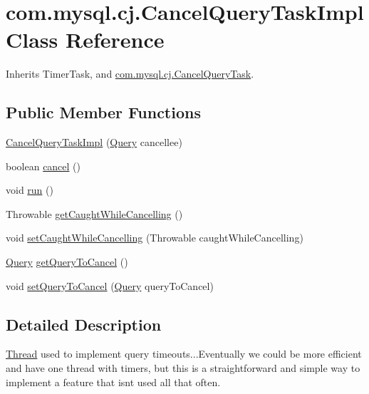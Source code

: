 \hypertarget{classcom_1_1mysql_1_1cj_1_1_cancel_query_task_impl}{}\section{com.\+mysql.\+cj.\+Cancel\+Query\+Task\+Impl Class Reference}
\label{classcom_1_1mysql_1_1cj_1_1_cancel_query_task_impl}


Inherits Timer\+Task, and \mbox{\hyperlink{interfacecom_1_1mysql_1_1cj_1_1_cancel_query_task}{com.\+mysql.\+cj.\+Cancel\+Query\+Task}}.

\subsection*{Public Member Functions}
\begin{DoxyCompactItemize}
\item 
\mbox{\hyperlink{classcom_1_1mysql_1_1cj_1_1_cancel_query_task_impl_a9a2ee8d146a3c365162fe26c214aa440}{Cancel\+Query\+Task\+Impl}} (\mbox{\hyperlink{interfacecom_1_1mysql_1_1cj_1_1_query}{Query}} cancellee)
\item 
boolean \mbox{\hyperlink{classcom_1_1mysql_1_1cj_1_1_cancel_query_task_impl_aa279eeabcc803503e806f552ee3fd46a}{cancel}} ()
\item 
void \mbox{\hyperlink{classcom_1_1mysql_1_1cj_1_1_cancel_query_task_impl_aca7be2b8368718d9f3901e44256385cb}{run}} ()
\item 
Throwable \mbox{\hyperlink{classcom_1_1mysql_1_1cj_1_1_cancel_query_task_impl_a15fc1cf4ae9eaf9fdaa427bae226b210}{get\+Caught\+While\+Cancelling}} ()
\item 
void \mbox{\hyperlink{classcom_1_1mysql_1_1cj_1_1_cancel_query_task_impl_a6ed7124ec0547111f98f3d9c32c0046f}{set\+Caught\+While\+Cancelling}} (Throwable caught\+While\+Cancelling)
\item 
\mbox{\hyperlink{interfacecom_1_1mysql_1_1cj_1_1_query}{Query}} \mbox{\hyperlink{classcom_1_1mysql_1_1cj_1_1_cancel_query_task_impl_ac478b7b9bd6ffb2803fbaf31d5e28943}{get\+Query\+To\+Cancel}} ()
\item 
void \mbox{\hyperlink{classcom_1_1mysql_1_1cj_1_1_cancel_query_task_impl_a8091c01445defc1368fb90fab42eca5d}{set\+Query\+To\+Cancel}} (\mbox{\hyperlink{interfacecom_1_1mysql_1_1cj_1_1_query}{Query}} query\+To\+Cancel)
\end{DoxyCompactItemize}


\subsection{Detailed Description}
\mbox{\hyperlink{class_thread}{Thread}} used to implement query timeouts...Eventually we could be more efficient and have one thread with timers, but this is a straightforward and simple way to implement a feature that isn\textquotesingle{}t used all that often. 

